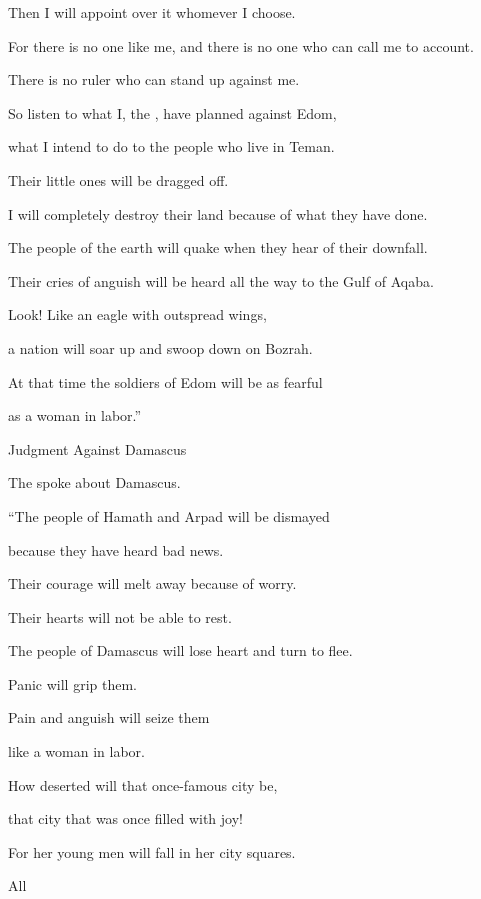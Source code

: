 {\par }{\Q Then I will appoint
over it whomever
I choose.
\par }{\Q For
there is no one
like me,
and there is no one
who can call
me to account.
\par }{\Q There is no
ruler
who
can stand up
against me.
\par }{\Q {}So
listen
to what I, the
{}, have
planned
against Edom,
\par }{\Q what
I intend
to do
to
the people who live
in Teman.
\par }{\Q Their little ones will be dragged
off.
\par }{\Q I will completely destroy their land
because
of what they have done.
\par }{\Q {}The people of the earth
will quake
when they hear
of their downfall.
\par }{\Q Their cries
of anguish
will be heard
all the way to the Gulf
of Aqaba.
\par }{\Q {}Look! Like an eagle
with outspread
wings,
\par }{\Q a nation will soar up and swoop down on
Bozrah.
\par }{\Q At that time
the soldiers
of Edom
will be
as fearful
\par }{\Q as a woman
in labor.”
\par }{\SH Judgment Against Damascus
\par }{\PP {}The
{} spoke about Damascus.
\par }{\Q “The people of Hamath
and Arpad
will be dismayed
\par }{\Q because
they have heard
bad
news.
\par }{\Q Their courage will melt
away because of worry.
\par }{\Q Their hearts will not
be able
to rest.
\par }{\Q {}The people of Damascus
will lose heart
and turn
to flee.
\par }{\Q Panic
will grip
them.
\par }{\Q Pain and anguish
will seize
them
\par }{\Q like a woman in labor.
\par }{\Q {}How
deserted
will that once-famous
city
be,
\par }{\Q that city
that was once filled with joy!
\par }{\Q {}For her young men
will fall
in her city squares.
\par }{\Q All
}
